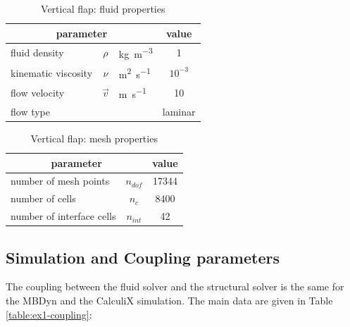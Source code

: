 \begin{table}[!htb]
	\begin{center}
		\begin{tabular}{ l c l | c } 
			\multicolumn{3}{c|}{parameter} & value  \\ 
			\hline
			fluid density  & $\rho$ & \si{kg.m^{-3}} & 1   \\
			kinematic viscosity & $\nu$& \si{m^2.s^{-1}} & $10^{-3}$  \\
			flow velocity & $\vec{v}$& \si{m.s^{-1}} & 10 \\
			flow type & & & laminar \\
		\end{tabular}
	\end{center}
	\caption{Vertical flap: fluid properties}
	\label{table:ex1-fluid}
\end{table}



\begin{table}[!htb]
	\begin{center}
		\begin{tabular}{ l c | c } 
			\multicolumn{2}{c|}{parameter} & value   \\ 
			\hline
			number of mesh points  & $n_{dof}$ & 17344     \\
			number of cells & $n_c$ & 8400  \\
			number of interface cells  & $n_{int}$ & 42  \\			
		\end{tabular}
	\end{center}
	\caption{Vertical flap: mesh properties}
	\label{table:ex1-mesh}
\end{table}



\subsection{Simulation and Coupling parameters}

The coupling between the fluid solver and the structural solver is the same for the MBDyn and the CalculiX simulation. The main data are given in Table \ref{table:ex1-coupling}:


